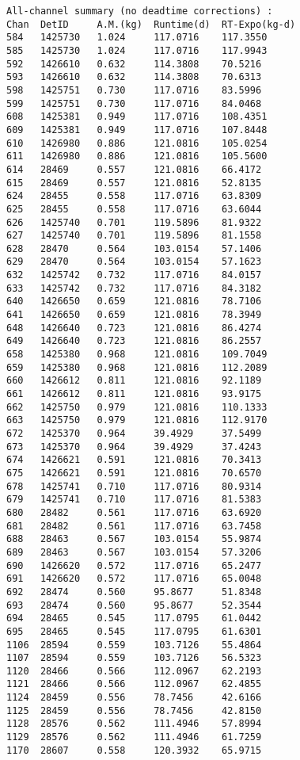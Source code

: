 \documentclass[notitlepage,rmp,aps,10pt]{revtex4-1}
\begin{document}
\begin{verbatim}
All-channel summary (no deadtime corrections) :
Chan  DetID     A.M.(kg)  Runtime(d)  RT-Expo(kg-d)
584   1425730   1.024     117.0716    117.3550
585   1425730   1.024     117.0716    117.9943
592   1426610   0.632     114.3808    70.5216
593   1426610   0.632     114.3808    70.6313
598   1425751   0.730     117.0716    83.5996
599   1425751   0.730     117.0716    84.0468
608   1425381   0.949     117.0716    108.4351
609   1425381   0.949     117.0716    107.8448
610   1426980   0.886     121.0816    105.0254
611   1426980   0.886     121.0816    105.5600
614   28469     0.557     121.0816    66.4172
615   28469     0.557     121.0816    52.8135
624   28455     0.558     117.0716    63.8309
625   28455     0.558     117.0716    63.6044
626   1425740   0.701     119.5896    81.9322
627   1425740   0.701     119.5896    81.1558
628   28470     0.564     103.0154    57.1406
629   28470     0.564     103.0154    57.1623
632   1425742   0.732     117.0716    84.0157
633   1425742   0.732     117.0716    84.3182
640   1426650   0.659     121.0816    78.7106
641   1426650   0.659     121.0816    78.3949
648   1426640   0.723     121.0816    86.4274
649   1426640   0.723     121.0816    86.2557
658   1425380   0.968     121.0816    109.7049
659   1425380   0.968     121.0816    112.2089
660   1426612   0.811     121.0816    92.1189
661   1426612   0.811     121.0816    93.9175
662   1425750   0.979     121.0816    110.1333
663   1425750   0.979     121.0816    112.9170
672   1425370   0.964     39.4929     37.5499
673   1425370   0.964     39.4929     37.4243
674   1426621   0.591     121.0816    70.3413
675   1426621   0.591     121.0816    70.6570
678   1425741   0.710     117.0716    80.9314
679   1425741   0.710     117.0716    81.5383
680   28482     0.561     117.0716    63.6920
681   28482     0.561     117.0716    63.7458
688   28463     0.567     103.0154    55.9874
689   28463     0.567     103.0154    57.3206
690   1426620   0.572     117.0716    65.2477
691   1426620   0.572     117.0716    65.0048
692   28474     0.560     95.8677     51.8348
693   28474     0.560     95.8677     52.3544
694   28465     0.545     117.0795    61.0442
695   28465     0.545     117.0795    61.6301
1106  28594     0.559     103.7126    55.4864
1107  28594     0.559     103.7126    56.5323
1120  28466     0.566     112.0967    62.2193
1121  28466     0.566     112.0967    62.4855
1124  28459     0.556     78.7456     42.6166
1125  28459     0.556     78.7456     42.8150
1128  28576     0.562     111.4946    57.8994
1129  28576     0.562     111.4946    61.7259
1170  28607     0.558     120.3932    65.9715

\end{verbatim}
\end{document}
